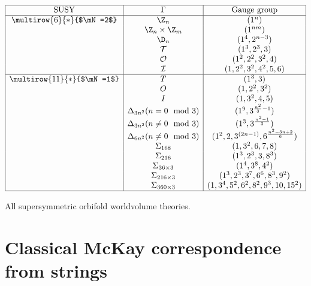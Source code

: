 \documentclass{worksheetclass}
\begin{document}
    \begin{table}[H]
        \centering
        $
        \begin{array}{|c|c|c|}
            \hline
            \text{SUSY} & \Gamma & \text{Gauge group} \\ \hline
            \multirow{6}{*}{$\mN=2$} & \Z_{n} & (1^n) \\
            & \Z_{n}\times\Z_m & (1^{nm}) \\
            & \D_{n} & (1^4,2^{n-3}) \\
            & \mathcal{T} & (1^3,2^3,3) \\
            & \mathcal{O} & (1^2,2^2,3^2,4) \\
            & \mathcal{I} & (1,2^2,3^2,4^2,5,6) \\ \hline
            \multirow{11}{*}{$\mN=1$} & T & (1^3,3) \\
            & O & (1,2^2,3^2) \\
            & I & (1,3^2,4,5) \\
            & \Delta_{3n^2} (n=0\mod 3) & (1^9,3^{\frac{n^2}{3}-1}) \\
            & \Delta_{3n^2} (n\neq0\mod 3) & (1^3,3^{\frac{n^2-1}{3}}) \\
            & \Delta_{6n^2} (n\neq0\mod 3) & (1^2,2,3^{(2n-1)},6^{\frac{n^2-3n+2}{6}}) \\
            & \Sigma_{168} & (1,3^2,6,7,8) \\
            & \Sigma_{216} & (1^3,2^3,3,8^3) \\
            & \Sigma_{36\times 3} & (1^4,3^8,4^2) \\
            & \Sigma_{216\times 3} & (1^3,2^3,3^7,6^6,8^3,9^2) \\
            & \Sigma_{360\times 3} & (1,3^4,5^2,6^2,8^2,9^3,10,15^2) \\ \hline
        \end{array}
        $
        \caption{All supersymmetric orbifold worldvolume theories.}
    \end{table}


\section{Classical McKay correspondence from strings}
\end{document}
